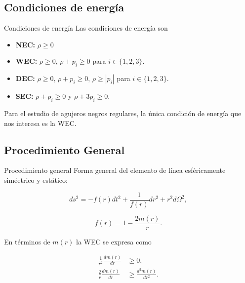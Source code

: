 \documentclass[t]{beamer}
\numberwithin{equation}{section}
\begin{document}
\subsection{Condiciones de energía}

\begin{frame}{Condiciones de energía}
\vspace{\fill}
Las condiciones de energía son \cite{carroll}
\begin{itemize}
\item \textbf{NEC:} $\rho \geq 0$

\item \textbf{WEC:} $\rho \geq 0$,  $\rho + p_{i} \geq 0$ para $i \in \{1,2,3\}$.

\item \textbf{DEC:} $\rho \geq 0$,  $\rho + p_{i} \geq 0$, $\rho \geq |p_{i}|$ para $i \in \{1,2,3\}$.

\item \textbf{SEC:} $\rho + p_{i} \geq 0$ y $\rho + 3p_{i} \geq 0$.
\end{itemize}


Para el estudio de agujeros negros regulares, la única condición de energía que nos interesa es la WEC.
\vspace{\fill}
\end{frame}

\subsection{Procedimiento General}

\begin{frame}{Procedimiento general}
Forma general del elemento de línea esféricamente siméetrico y estático:

\begin{equation}
\label{general static spherical}
ds^2 = -f(r)dt^2 + \frac{1}{f(r)}dr^2 + r^2d\Omega^2,
\end{equation}

\begin{equation}
\label{general f}
f(r) = 1 - \frac{2m(r)}{r}.
\end{equation}

En términos de $m(r)$ la WEC se expresa como \cite{vanegas-weak}

\begin{equation}
\label{mass wec ineq}
\begin{aligned}
\frac{1}{r^2}\frac{dm(r)}{dr} &\geq 0,\\
\frac{2}{r}\frac{dm(r)}{dr} &\geq \frac{d^2m(r)}{dr^2}.
\end{aligned}
\end{equation}

\end{frame}
\end{document}
